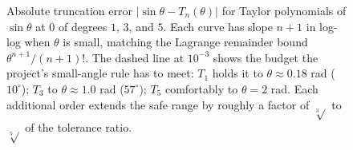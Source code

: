 \begin{figure}[ht]
\caption[Taylor-truncation error for $\sin\theta$ at orders 1, 3, 5]{Absolute
truncation error $|\sin\theta - T_n(\theta)|$ for Taylor polynomials of
$\sin\theta$ at $0$ of degrees $1$, $3$, and $5$. Each curve has slope
$n+1$ in log-log when $\theta$ is small, matching the Lagrange remainder
bound $\theta^{n+1}/(n+1)!$. The dashed line at $10^{-3}$ shows the
budget the project's small-angle rule has to meet: $T_1$ holds it to
$\theta \approx 0.18$ rad ($10^{\circ}$); $T_3$ to $\theta \approx 1.0$
rad ($57^{\circ}$); $T_5$ comfortably to $\theta = 2$ rad. Each
additional order extends the safe range by roughly a factor of $\sqrt[3]{}$
to $\sqrt[5]{}$ of the tolerance ratio.}
\label{fig:vol02:ch04:taylor-error}
\end{figure}
